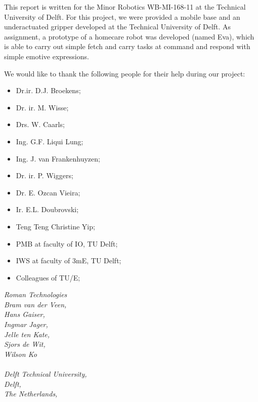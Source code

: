 \documentclass[technical_document.tex]{subfiles}
\begin{document}
This report is written for the Minor Robotics WB-MI-168-11 at the Technical University of Delft. For this project, we were provided a mobile base and an underactuated gripper developed at the Technical University of Delft. As assignment, a prototype of a homecare robot was developed (named Eva), which is able to carry out simple fetch and carry tasks at command and respond with simple emotive expressions.

We would like to thank the following people for their help during our project:
\begin{itemize}
\item[] Dr.ir. D.J. Broekens;
\item[] Dr. ir. M. Wisse;
\item[] Drs. W. Caarls;
\item[] Ing. G.F. Liqui Lung; 
\item[] Ing. J. van Frankenhuyzen; 
\item[] Dr. ir. P. Wiggers; 
\item[] Dr. E. Ozcan Vieira;
\item[] Ir. E.L. Doubrovski; 
\item[] Teng Teng Christine Yip;
\item[] PMB at faculty of IO, TU Delft;
\item[] IWS at faculty of 3mE, TU Delft;
\item[] Colleagues of TU/E;
\end{itemize}
 

\textit{
Roman Technologies\\
Bram van der Veen,\\
Hans Gaiser,\\
Ingmar Jager,\\
Jelle ten Kate,\\  
Sjors de Wit,\\
Wilson Ko\\\\
Delft Technical University,\\
Delft,\\
The Netherlands,\\
}
\end{document}
